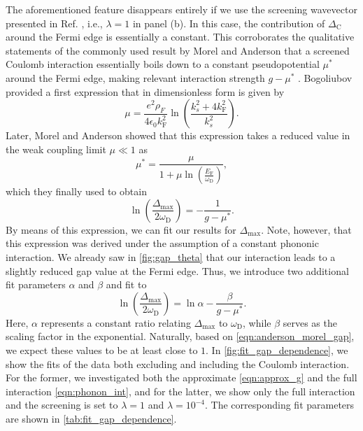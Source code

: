 \documentclass[
    reprint, 
    aps,
    preprintnumbers,
    twocolumn,
    prb,
    superscriptaddress
]{revtex4-2}
\newcommand{\kf}{k_{\mathrm{F}}}
\newcommand{\Ef}{E_\mathrm{F}}
\newcommand{\debye}{\omega_\mathrm{D}}
\newcommand{\maxGap}{\Delta_\mathrm{max}}
\newcommand{\deltaC}{\Delta_\mathrm{C}}
\begin{document}
The aforementioned feature disappears entirely if we use the screening wavevector presented in Ref. \cite{rickayzen1980}, i.e., $\lambda = 1$ in panel (b).
In this case, the contribution of $\deltaC$ around the Fermi edge is essentially a constant.
This corroborates the qualitative statements of the commonly used result by Morel and Anderson \cite{morel1962}
that a screened Coulomb interaction essentially boils down to a constant pseudopotential $\mu^*$ around the Fermi edge, making relevant interaction strength $g - \mu^*$ \cite{mielke1997,sigrist2005,kostrzewa2018,fischer2018,simonato2023}.
Bogoliubov provided a first expression \cite{bogoliubov1958} that in dimensionless form is given by
\begin{equation}
  \label{eqn:bogoliubov_mu}
  \mu = \frac{e^2 \rho_F }{4 \epsilon_0 \kf^2 } \ln \left( \frac{k_s^2 + 4 \kf^2}{k_s^2} \right).
\end{equation}
Later, Morel and Anderson showed that this expression takes a reduced value in the weak coupling limit $\mu \ll 1$ as
\begin{equation}
  \label{eqn:anderson_morel_mu}
  \mu^* = \frac{\mu}{1 + \mu \ln \left( \frac{\Ef}{\debye} \right)},
\end{equation}
which they finally used to obtain \cite{morel1962}
\begin{equation}
  \label{eqn:anderson_morel_gap}
  \ln \left( \frac{\maxGap}{2 \debye} \right) = -\frac{1}{g - \mu^*}.
\end{equation}
By means of this expression, we can fit our results for $\maxGap$. 
Note, however, that this expression was derived under the assumption of a constant phononic interaction.
We already saw in \autoref{fig:gap_theta} that our interaction leads to a slightly reduced gap value at the Fermi edge.
Thus, we introduce two additional fit parameters $\alpha$ and $\beta$ and fit to
\begin{equation}
  \label{eqn:fit_gap}
  \ln \left( \frac{\maxGap}{2 \debye} \right) = \ln \alpha - \frac{\beta}{g - \mu^*}.
\end{equation}
Here, $\alpha$ represents a constant ratio relating $\maxGap$ to $\debye$, while $\beta$ serves as the scaling factor in the exponential.
Naturally, based on \eqref{eqn:anderson_morel_gap}, we expect these values to be at least close to $1$.
In \autoref{fig:fit_gap_dependence}, we show the fits of the data both excluding and including the Coulomb interaction.
For the former, we investigated both the approximate \eqref{eqn:approx_g} and the full interaction \eqref{eqn:phonon_int},
and for the latter, we show only the full interaction and the screening is set to $\lambda=1$ and $\lambda=10^{-4}$.
The corresponding fit parameters are shown in \autoref{tab:fit_gap_dependence}.
\end{document}
